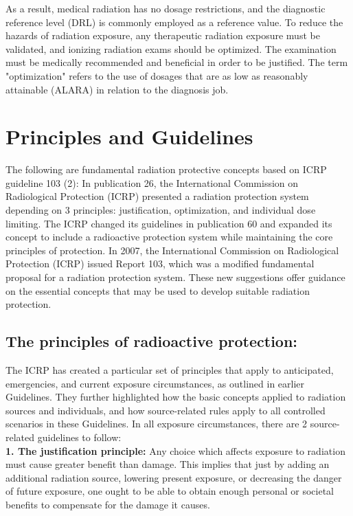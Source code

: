 \documentclass{article}
\begin{document}
As a result, medical radiation has no dosage restrictions, and the diagnostic reference level (DRL) is commonly employed as a reference value. To reduce the hazards of radiation exposure, any therapeutic radiation exposure must be validated, and ionizing radiation exams should be optimized. The examination must be medically recommended and beneficial in order to be justified. The term "optimization" refers to the use of dosages that are as low as reasonably attainable (ALARA) in relation to the diagnosis job.


\section{Principles and Guidelines}

The following are fundamental radiation protective concepts based on ICRP guideline 103 (2): In publication 26, the International Commission on Radiological Protection (ICRP) presented a radiation protection system depending on 3 principles: justification, optimization, and individual dose limiting. The ICRP changed its guidelines in publication 60 and expanded its concept to include a radioactive protection system while maintaining the core principles of protection. In 2007, the International Commission on Radiological Protection (ICRP) issued Report 103, which was a modified fundamental proposal for a radiation protection system. These new suggestions offer guidance on the essential concepts that may be used to develop suitable radiation protection.

\subsection{The principles of radioactive protection:} The ICRP has created a particular set of principles that apply to anticipated, emergencies, and current exposure circumstances, as outlined in earlier Guidelines. They further highlighted how the basic concepts applied to radiation sources and individuals, and how source-related rules apply to all controlled scenarios in these Guidelines. In all exposure circumstances, there are 2 source-related guidelines to follow:\\

\textbf{1.	The justification principle:} Any choice which affects exposure to radiation must cause greater benefit than damage. This implies that just by adding an additional radiation source, lowering present exposure, or decreasing the danger of future exposure, one ought to be able to obtain enough personal or societal benefits to compensate for the damage it causes.\\
\end{document}
